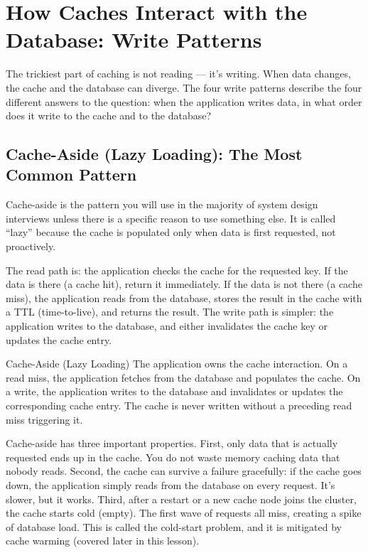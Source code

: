 \documentclass[11pt,a4paper]{article}
\begin{document}
\section{How Caches Interact with the Database: Write Patterns}

The trickiest part of caching is not reading --- it's writing. When data changes, the cache and the database can diverge. The four write patterns describe the four different answers to the question: when the application writes data, in what order does it write to the cache and to the database?

\subsection{Cache-Aside (Lazy Loading): The Most Common Pattern}

Cache-aside is the pattern you will use in the majority of system design interviews unless there is a specific reason to use something else. It is called ``lazy'' because the cache is populated only when data is first requested, not proactively.

The read path is: the application checks the cache for the requested key. If the data is there (a cache hit), return it immediately. If the data is not there (a cache miss), the application reads from the database, stores the result in the cache with a TTL (time-to-live), and returns the result. The write path is simpler: the application writes to the database, and either invalidates the cache key or updates the cache entry.

\begin{termbox}{Cache-Aside (Lazy Loading)}
The application owns the cache interaction. On a read miss, the application fetches from the database and populates the cache. On a write, the application writes to the database and invalidates or updates the corresponding cache entry. The cache is never written without a preceding read miss triggering it.
\end{termbox}

Cache-aside has three important properties. First, only data that is actually requested ends up in the cache. You do not waste memory caching data that nobody reads. Second, the cache can survive a failure gracefully: if the cache goes down, the application simply reads from the database on every request. It's slower, but it works. Third, after a restart or a new cache node joins the cluster, the cache starts cold (empty). The first wave of requests all miss, creating a spike of database load. This is called the cold-start problem, and it is mitigated by cache warming (covered later in this lesson).
\end{document}
